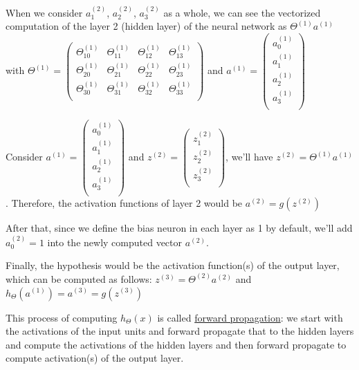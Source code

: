 \documentclass[12pt]{article}
\begin{document}
	When we consider $a_1^{(2)}$, $a_2^{(2)}$, $a_3^{(2)}$ as a whole, we can see the vectorized computation of the layer 2 (hidden layer) of the neural network as $\Theta^{(1)} a^{(1)}$ with $\Theta^{(1)}=\begin{pmatrix} \Theta_{10}^{(1)} & \Theta_{11}^{(1)} & \Theta_{12}^{(1)} & \Theta_{13}^{(1)} \\ \Theta_{20}^{(1)} & \Theta_{21}^{(1)} & \Theta_{22}^{(1)} & \Theta_{23}^{(1)} \\ \Theta_{30}^{(1)} & \Theta_{31}^{(1)} & \Theta_{32}^{(1)} & \Theta_{33}^{(1)} \\ \end{pmatrix}$ and $a^{(1)}=\begin{pmatrix} a_0^{(1)} \\ a_1^{(1)} \\ a_2^{(1)} \\ a_3^{(1)} \\ \end{pmatrix}$
	
	Consider $a^{(1)}=\begin{pmatrix} a_0^{(1)} \\ a_1^{(1)} \\ a_2^{(1)} \\ a_3^{(1)} \\ \end{pmatrix}$ and $z^{(2)}=\begin{pmatrix} z_1^{(2)} \\ z_2^{(2)} \\ z_3^{(2)} \\ \end{pmatrix}$, we'll have $z^{(2)}=\Theta^{(1)} a^{(1)}$. Therefore, the activation functions of layer 2 would be $a^{(2)}=g(z^{(2)})$
	
	After that, since we define the bias neuron in each layer as 1 by default, we'll add $a_0^{(2)}=1$ into the newly computed vector $a^{(2)}$.
	
	Finally, the hypothesis would be the activation function(s) of the output layer, which can be computed as follows: $z^{(3)}=\Theta^{(2)} a^{(2)}$ and $h_\Theta (a^{(1)})=a^{(3)}=g(z^{(3)})$
	
	This process of computing $h_\Theta (x)$ is called \underline{forward propagation}: we start with the activations of the input units and forward propagate that to the hidden layers and compute the activations of the hidden layers and then forward propagate to compute activation(s) of the output layer. 
	
\end{document}
